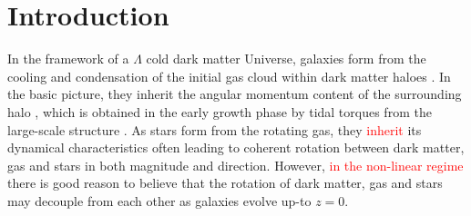\documentclass[fleqn,usenatbib]{mnras}
\newcommand{\red}[1]{{\textcolor{red}{#1}}}
\begin{document}
\section{Introduction}
In the framework of a $\Lambda$ cold dark matter Universe, galaxies form from the cooling and condensation of the initial gas cloud within dark matter haloes \citep{white1978, mo1998}. In the basic picture, they inherit the angular momentum content of the surrounding halo \citep[][]{fall1980}, which is obtained in the early growth phase by tidal torques from the large-scale structure \citep[e.g.][]{peebles1969, Doroshkevich1970}. As stars form from the rotating gas, they \red{inherit} its dynamical characteristics often leading to coherent rotation between dark matter, gas and stars in both magnitude and direction. However, \red{in the non-linear regime} there is good reason to believe that the rotation of dark matter, gas and stars may decouple from each other as galaxies evolve up-to $z=0$. 
 
\end{document}
